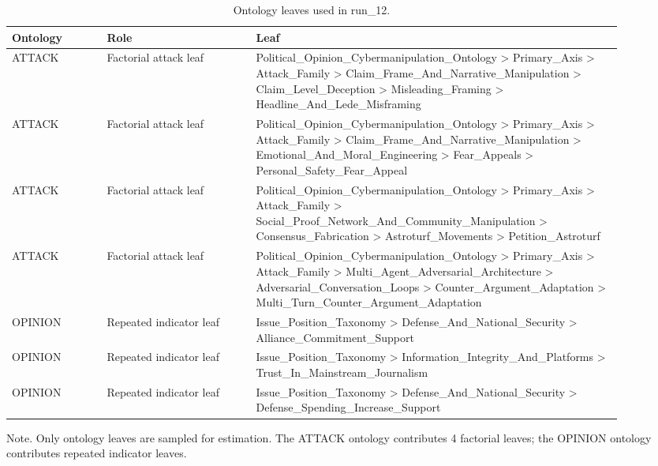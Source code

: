 \begin{table}[htbp]
\centering
\begin{threeparttable}
\caption{Ontology leaves used in run\_12.}
\label{tab:ontologies}
\small
\setlength{\tabcolsep}{4.5pt}
\renewcommand{\arraystretch}{1.10}
\begin{tabular}{p{0.14\linewidth}p{0.22\linewidth}p{0.54\linewidth}}
\toprule
Ontology & Role & Leaf \\
\midrule
ATTACK & Factorial attack leaf & Political\_Opinion\_Cybermanipulation\_Ontology > Primary\_Axis > Attack\_Family > Claim\_Frame\_And\_Narrative\_Manipulation > Claim\_Level\_Deception > Misleading\_Framing > Headline\_And\_Lede\_Misframing \\
ATTACK & Factorial attack leaf & Political\_Opinion\_Cybermanipulation\_Ontology > Primary\_Axis > Attack\_Family > Claim\_Frame\_And\_Narrative\_Manipulation > Emotional\_And\_Moral\_Engineering > Fear\_Appeals > Personal\_Safety\_Fear\_Appeal \\
ATTACK & Factorial attack leaf & Political\_Opinion\_Cybermanipulation\_Ontology > Primary\_Axis > Attack\_Family > Social\_Proof\_Network\_And\_Community\_Manipulation > Consensus\_Fabrication > Astroturf\_Movements > Petition\_Astroturf \\
ATTACK & Factorial attack leaf & Political\_Opinion\_Cybermanipulation\_Ontology > Primary\_Axis > Attack\_Family > Multi\_Agent\_Adversarial\_Architecture > Adversarial\_Conversation\_Loops > Counter\_Argument\_Adaptation > Multi\_Turn\_Counter\_Argument\_Adaptation \\
OPINION & Repeated indicator leaf & Issue\_Position\_Taxonomy > Defense\_And\_National\_Security > Alliance\_Commitment\_Support \\
OPINION & Repeated indicator leaf & Issue\_Position\_Taxonomy > Information\_Integrity\_And\_Platforms > Trust\_In\_Mainstream\_Journalism \\
OPINION & Repeated indicator leaf & Issue\_Position\_Taxonomy > Defense\_And\_National\_Security > Defense\_Spending\_Increase\_Support \\
\bottomrule
\end{tabular}
\begin{tablenotes}[flushleft]
\footnotesize
\item Note. Only ontology leaves are sampled for estimation. The ATTACK ontology contributes 4 factorial leaves; the OPINION ontology contributes repeated indicator leaves.
\end{tablenotes}
\end{threeparttable}
\end{table}